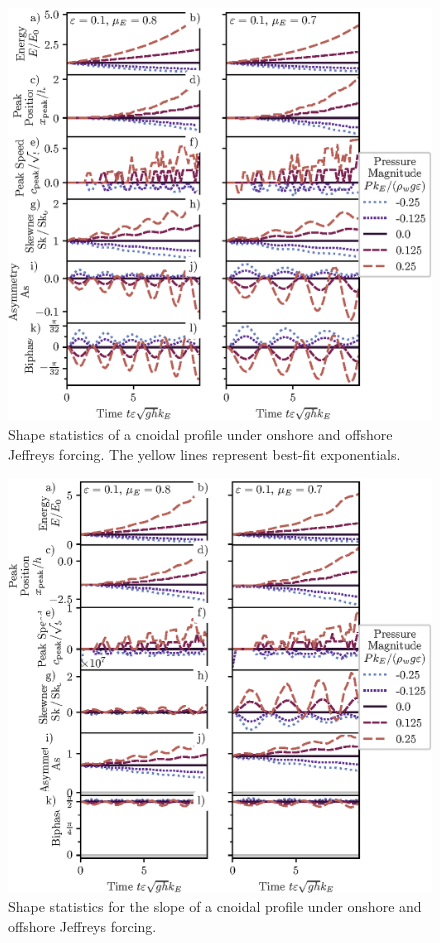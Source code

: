 \documentclass{jfm}
\begin{document}
\begin{figure}
  \centering
  \includegraphics{Skew-Asymm-Cnoidal.eps}
  \caption{
    Shape statistics of a cnoidal profile under onshore and offshore
    Jeffreys forcing. The yellow lines represent best-fit exponentials.
  }
\end{figure}

\begin{figure}
  \centering
  \includegraphics{Slope-Skew-Asymm-Cnoidal.eps}
  \caption{
    Shape statistics for the slope of a cnoidal profile under onshore
    and offshore Jeffreys forcing.
  }
\end{figure}
\end{document}
